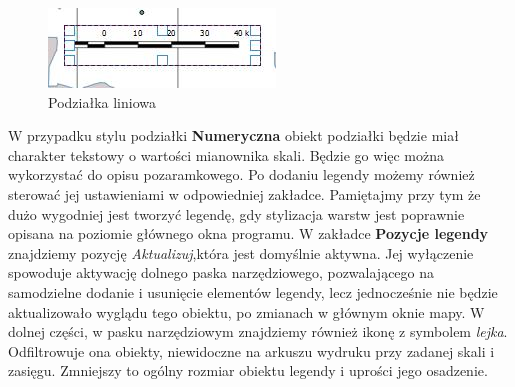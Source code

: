 \documentclass[12pt,a4paper]{book}
\begin{document}
\begin{center}
\begin{figure}
\includegraphics[width=6.033cm,height=2.117cm]{008-podzialka-liniowa.jpg}
\caption{Podziałka liniowa}
\end{figure}
\end{center}
W przypadku stylu podziałki \textbf{Numeryczna }obiekt podziałki będzie miał charakter tekstowy o wartości mianownika skali. Będzie go więc można wykorzystać do opisu pozaramkowego. Po dodaniu legendy możemy również sterować jej ustawieniami w odpowiedniej zakładce. Pamiętajmy przy tym że dużo wygodniej jest tworzyć legendę, gdy stylizacja warstw jest poprawnie opisana na poziomie głównego okna programu. W zakładce \textbf{Pozycje legendy }znajdziemy pozycję \textit{Aktualizuj},która jest domyślnie aktywna. Jej wyłączenie\textbf{ }spowoduje aktywację dolnego paska narzędziowego, pozwalającego na samodzielne dodanie i usunięcie elementów legendy, lecz jednocześnie nie będzie aktualizowało wyglądu tego obiektu, po zmianach w głównym oknie mapy. W dolnej części, w pasku narzędziowym znajdziemy również ikonę z symbolem \textit{lejka}. Odfiltrowuje ona obiekty, niewidoczne na arkuszu wydruku przy zadanej skali i zasięgu. Zmniejszy to ogólny rozmiar obiektu legendy i uprości jego osadzenie.
\end{document}
